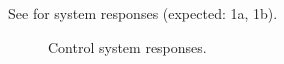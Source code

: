 \documentclass{article}
\begin{document}

See  for system responses (expected: 1a, 1b).

\begin{figure}[h]
  \centering
  
  \caption{Control system responses.}
  \label{fig:equations}
\end{figure}
\end{document}

